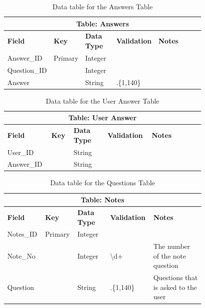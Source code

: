 \documentclass{article}
\begin{document}
\clearpage

\begin{table}[ht]
    \centering
    \begin{tabular}{ | p{0.15\linewidth} | p{0.1\linewidth} | p{0.16\linewidth} | p{0.14\linewidth} | p{0.25\linewidth} | }
    \hline
    \multicolumn{5}{|c|}{\textbf{Table: Answers}}\\
    \hline
    \hline
    \textbf{Field} & \textbf{Key} & \textbf{Data Type} & \textbf{Validation} & \textbf{Notes} \\
    \hline
    Answer\_ID & Primary & Integer & & \\
    \hline
    Question\_ID & & Integer & & \\
    \hline
    Answer & & String & .\{1,140\} & \\
    \hline
    \end{tabular}
    \caption{Data table for the Answers Table}
\end{table}

\begin{table}[ht]
    \centering
    \begin{tabular}{ | p{0.15\linewidth} | p{0.1\linewidth} | p{0.16\linewidth} | p{0.14\linewidth} | p{0.25\linewidth} | }
    \hline
    \multicolumn{5}{|c|}{\textbf{Table: User Answer}}\\
    \hline
    \hline
    \textbf{Field} & \textbf{Key} & \textbf{Data Type} & \textbf{Validation} & \textbf{Notes} \\
    \hline
    User\_ID & & String & & \\
    \hline
    Answer\_ID & & String & & \\
    \hline
    \end{tabular}
    \caption{Data table for the User Answer Table}
\end{table}

\begin{table}[ht]
    \centering
    \begin{tabular}{ | p{0.15\linewidth} | p{0.1\linewidth} | p{0.16\linewidth} | p{0.14\linewidth} | p{0.25\linewidth} | }
    \hline
    \multicolumn{5}{|c|}{\textbf{Table: Notes}}\\
    \hline
    \hline
    \textbf{Field} & \textbf{Key} & \textbf{Data Type} & \textbf{Validation} & \textbf{Notes} \\
    \hline
    Notes\_ID & Primary & Integer & & \\
    \hline
    Note\_No & & Integer & \textbackslash d+ & The number of the note question\\
    \hline
    Question & & String & .\{1,140\} & Questions that is asked to the user\\
    \hline
    \end{tabular}
    \caption{Data table for the Questions Table}
\end{table}
\end{document}
